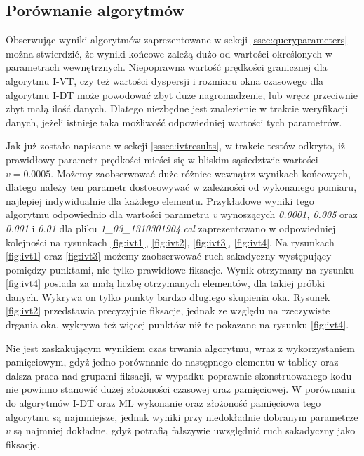\subsection{Porównanie algorytmów}
\label{ssec:compalgorithms}
Obserwując wyniki algorytmów zaprezentowane w sekcji \ref{ssec:queryparameters} można stwierdzić, że wyniki końcowe zależą dużo od wartości określonych w parametrach wewnętrznych. Niepoprawna wartość prędkości granicznej dla algorytmu I-VT, czy też wartości dyspersji i rozmiaru okna czasowego dla algorytmu I-DT może powodować zbyt duże nagromadzenie, lub wręcz przeciwnie zbyt małą ilość danych. Dlatego niezbędne jest znalezienie w trakcie weryfikacji danych, jeżeli istnieje taka możliwość odpowiedniej wartości tych parametrów.\par
Jak już zostało napisane w sekcji \ref{sssec:ivtresults}, w trakcie testów odkryto, iż prawidłowy parametr prędkości mieści się w bliskim sąsiedztwie wartości $v = 0.0005$. Możemy zaobserwować duże różnice wewnątrz wynikach końcowych, dlatego należy ten parametr dostosowywać w zależności od wykonanego pomiaru, najlepiej indywidualnie dla każdego elementu. Przykładowe wyniki tego algorytmu odpowiednio dla wartości parametru \emph{v} wynoszących \emph{0.0001, 0.005} oraz \emph{0.001} i \emph{0.01} dla pliku \emph{1\_03\_1310301904.cal} zaprezentowano w odpowiedniej kolejności na rysunkach \ref{fig:ivt1}, \ref{fig:ivt2}, \ref{fig:ivt3}, \ref{fig:ivt4}. Na rysunkach \ref{fig:ivt1} oraz \ref{fig:ivt3} możemy zaobserwować ruch sakadyczny występujący pomiędzy punktami, nie tylko prawidłowe fiksacje. Wynik otrzymany na rysunku \ref{fig:ivt4} posiada za małą liczbę otrzymanych elementów, dla takiej próbki danych. Wykrywa on tylko punkty bardzo długiego skupienia oka. Rysunek \ref{fig:ivt2} przedstawia precyzyjnie fiksacje, jednak ze względu na rzeczywiste drgania oka, wykrywa też więcej punktów niż te pokazane na rysunku \ref{fig:ivt4}.\par
Nie jest zaskakującym wynikiem czas trwania algorytmu, wraz z wykorzystaniem pamięciowym, gdyż jedno porównanie do następnego elementu w tablicy oraz dalsza praca nad grupami fiksacji, w wypadku poprawnie skonstruowanego kodu nie powinno stanowić dużej złożoności czasowej oraz pamięciowej. W porównaniu do algorytmów I-DT oraz ML wykonanie oraz złożoność pamięciowa tego algorytmu są najmniejsze, jednak wyniki przy niedokładnie dobranym parametrze $v$ są najmniej dokładne, gdyż potrafią fałszywie uwzględnić ruch sakadyczny jako fiksację.
